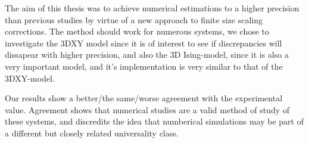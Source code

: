 The aim of this thesis was to achieve numerical estimations to a higher precision than previous studies by virtue of a new approach to finite size scaling corrections. The method should work for numerous systems, we chose to investigate the 3DXY model since it is of interest to see if discrepancies will dissapear with higher precision, and also the 3D Ising-model, since it is also a very important model, and it's implementation is very similar to that of the 3DXY-model. 

Our results show a better/the same/worse agreement with the experimental value. Agreement shows that numerical studies are a valid method of study of these systems, and discredits the idea that numberical simulations may be part of a different but closely related universality class.


